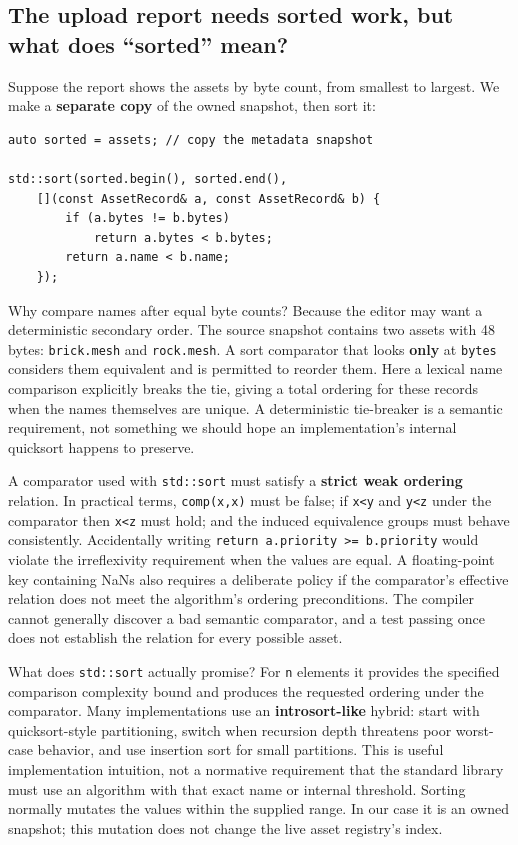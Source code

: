 \subsection{The upload report needs sorted work, but what does ``sorted'' mean?}\label{05-engine-i-ch006-the-upload-report-needs-sorted-work-but-what-does-sorted-mean}

Suppose the report shows the assets by byte count, from smallest to largest. We make a \textbf{separate copy} of the owned snapshot, then sort it:

\begin{verbatim}
auto sorted = assets; // copy the metadata snapshot

std::sort(sorted.begin(), sorted.end(),
    [](const AssetRecord& a, const AssetRecord& b) {
        if (a.bytes != b.bytes)
            return a.bytes < b.bytes;
        return a.name < b.name;
    });
\end{verbatim}

Why compare names after equal byte counts? Because the editor may want a deterministic secondary order. The source snapshot contains two assets with 48 bytes: \texttt{brick.mesh} and \texttt{rock.mesh}. A sort comparator that looks \textbf{only} at \texttt{bytes} considers them equivalent and is permitted to reorder them. Here a lexical name comparison explicitly breaks the tie, giving a total ordering for these records when the names themselves are unique. A deterministic tie-breaker is a semantic requirement, not something we should hope an implementation's internal quicksort happens to preserve.

A comparator used with \texttt{std::sort} must satisfy a \textbf{strict weak ordering} relation. In practical terms, \texttt{comp(x,x)} must be false; if \texttt{x\textless{}y} and \texttt{y\textless{}z} under the comparator then \texttt{x\textless{}z} must hold; and the induced equivalence groups must behave consistently. Accidentally writing \texttt{return\ a.priority\ \textgreater{}=\ b.priority} would violate the irreflexivity requirement when the values are equal. A floating-point key containing NaNs also requires a deliberate policy if the comparator's effective relation does not meet the algorithm's ordering preconditions. The compiler cannot generally discover a bad semantic comparator, and a test passing once does not establish the relation for every possible asset.

What does \texttt{std::sort} actually promise? For \texttt{n} elements it provides the specified comparison complexity bound and produces the requested ordering under the comparator. Many implementations use an \textbf{introsort-like} hybrid: start with quicksort-style partitioning, switch when recursion depth threatens poor worst-case behavior, and use insertion sort for small partitions. This is useful implementation intuition, not a normative requirement that the standard library must use an algorithm with that exact name or internal threshold. Sorting normally mutates the values within the supplied range. In our case it is an owned snapshot; this mutation does not change the live asset registry's index.

